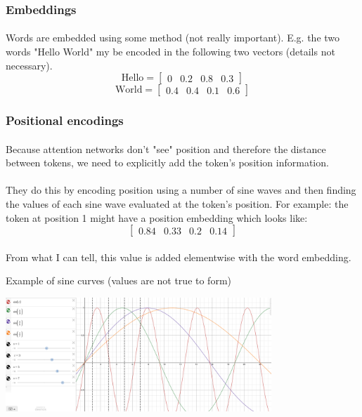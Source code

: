 \documentclass{article}
\begin{document}
    \subsubsection{Embeddings}
    \paragraph{} Words are embedded using some method (not really important). E.g. the two words "Hello World" my be encoded in the following two vectors (details not necessary).
    \[ \text{Hello} = \begin{bmatrix}
        0 & 0.2 & 0.8 & 0.3
    \end{bmatrix} \]
    \[ \text{World} = \begin{bmatrix}
        0.4 & 0.4 & 0.1 & 0.6
    \end{bmatrix} \]

    \subsubsection{Positional encodings}
    \paragraph{} Because attention networks don't "see" position and therefore the distance between tokens, we need to explicitly add the token's position information.
    \paragraph{} They do this by encoding position using a number of sine waves and then finding the values of each sine wave evaluated at the token's position.
    For example: the token at position 1 might have a position embedding which looks like:
    \[ \begin{bmatrix}
        0.84 & 0.33 & 0.2 & 0.14
    \end{bmatrix} \]

    \paragraph{} From what I can tell, this value is added elementwise with the word embedding.

    Example of sine curves (values are not true to form)

    \includegraphics[width=10.0cm]{fig5.png}
\end{document}
